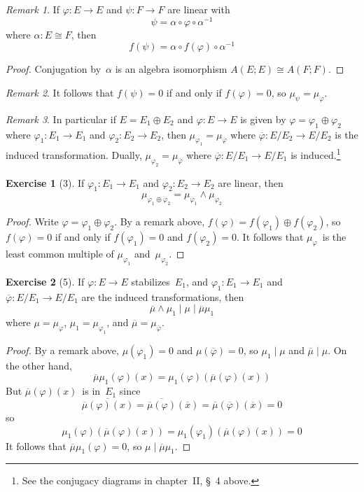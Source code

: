 \documentclass[letterpaper,12pt]{article}
\newcommand{\iso}{\cong}
\newcommand{\divides}{\mid}
\newcommand{\after}{\circ}
\newcommand{\meet}{\wedge}
\newcommand{\dsum}{\oplus}
\newcommand{\proj}[1]{\overline{#1}}
\theoremstyle{definition}
\newtheorem*{exer}{Exercise}
\theoremstyle{remark}
\newtheorem*{rmk}{Remark}
\begin{document}
\begin{rmk}
If \(\varphi:E\to E\) and \(\psi:F\to F\) are linear with
\[\psi=\alpha\after\varphi\after\alpha^{-1}\]
where \(\alpha:E\iso F\), then
\[f(\psi)=\alpha\after f(\varphi)\after\alpha^{-1}\]
\end{rmk}
\begin{proof}
Conjugation by~\(\alpha\) is an algebra isomorphism \(A(E;E)\iso A(F;F)\).
\end{proof}

\begin{rmk}
It follows that \(f(\psi)=0\) if and only if \(f(\varphi)=0\), so \(\mu_{\psi}=\mu_{\varphi}\).
\end{rmk}

\begin{rmk}
In particular if \(E=E_1\dsum E_2\) and \(\varphi:E\to E\) is given by \(\varphi=\varphi_1\dsum\varphi_2\) where \(\varphi_1:E_1\to E_1\) and \(\varphi_2:E_2\to E_2\), then \(\mu_{\varphi_1}=\mu_{\proj{\varphi}}\) where \(\proj{\varphi}:E/E_2\to E/E_2\) is the induced transformation. Dually, \(\mu_{\varphi_2}=\mu_{\proj{\varphi}}\) where \(\proj{\varphi}:E/E_1\to E/E_1\) is induced.\footnote{See the conjugacy diagrams in chapter~II, \S~4 above.}
\end{rmk}

\begin{exer}[3]
If \(\varphi_1:E_1\to E_1\) and \(\varphi_2:E_2\to E_2\) are linear, then
\[\mu_{\varphi_1\dsum\varphi_2}=\mu_{\varphi_1}\meet\mu_{\varphi_2}\]
\end{exer}
\begin{proof}
Write \(\varphi=\varphi_1\dsum\varphi_2\). By a remark above, \(f(\varphi)=f(\varphi_1)\dsum f(\varphi_2)\), so \(f(\varphi)=0\) if and only if \(f(\varphi_1)=0\) and \(f(\varphi_2)=0\). It follows that \(\mu_{\varphi}\)~is the least common multiple of \(\mu_{\varphi_1}\) and~\(\mu_{\varphi_2}\).
\end{proof}

\begin{exer}[5]
If \(\varphi:E\to E\) stabilizes~\(E_1\), and \(\varphi_1:E_1\to E_1\) and \(\proj{\varphi}:E/E_1\to E/E_1\) are the induced transformations, then
\[\proj{\mu}\meet\mu_1\divides\mu\divides\proj{\mu}\mu_1\]
where \(\mu=\mu_{\varphi}\), \(\mu_1=\mu_{\varphi_1}\), and \(\proj{\mu}=\mu_{\proj{\varphi}}\).
\end{exer}
\begin{proof}
By a remark above, \(\mu(\varphi_1)=0\) and \(\mu(\proj{\varphi})=0\), so \(\mu_1\divides\mu\) and \(\proj{\mu}\divides\mu\). On the other hand,
\[\proj{\mu}\mu_1(\varphi)(x)=\mu_1(\varphi)(\proj{\mu}(\varphi)(x))\]
But \(\proj{\mu}(\varphi)(x)\)~is in~\(E_1\) since
\[\proj{\proj{\mu}(\varphi)(x)}=\proj{\proj{\mu}(\varphi)}(\proj{x})=\proj{\mu}(\proj{\varphi})(\proj{x})=0\]
so
\[\mu_1(\varphi)(\proj{\mu}(\varphi)(x))=\mu_1(\varphi_1)(\proj{\mu}(\varphi)(x))=0\]
It follows that \(\proj{\mu}\mu_1(\varphi)=0\), so \(\mu\divides\proj{\mu}\mu_1\).
\end{proof}
\end{document}
